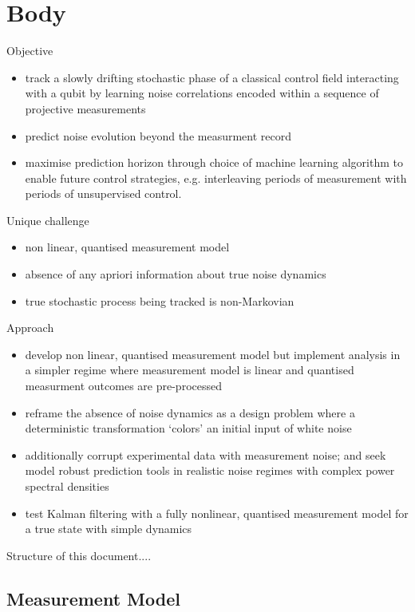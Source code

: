 \section{Body}

Objective
\begin{itemize}
\item track a slowly drifting stochastic phase of a classical control field interacting with a qubit by learning noise correlations encoded within a sequence of projective measurements 
\item  predict noise evolution beyond the measurment record
\item maximise prediction horizon through choice of machine learning algorithm to enable future control strategies, e.g. interleaving periods of measurement with periods of unsupervised control. 
\end{itemize}

Unique challenge 
\begin{itemize}
\item non linear, quantised measurement model
\item absence of any apriori information about true noise dynamics 
\item true stochastic process being tracked is non-Markovian
\end{itemize}

Approach
\begin{itemize}
\item develop non linear, quantised measurement model but implement analysis in a simpler regime where measurement model is linear and quantised measurment outcomes are pre-processed
\item reframe the absence of noise dynamics as a design problem where a deterministic transformation `colors' an initial input of white noise
\item additionally corrupt experimental data with measurement noise; and seek model robust prediction tools in realistic noise regimes with complex power spectral densities 
\item test Kalman filtering with a fully nonlinear, quantised measurement model for a true state with simple dynamics
\end{itemize}

Structure of this document....

\subsection{Measurement Model}

